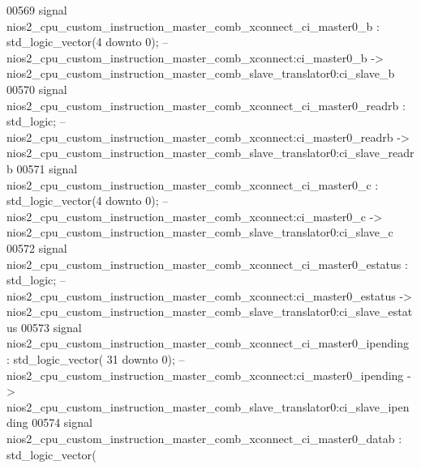 \begin{DoxyCode}
00569     \textcolor{keywordflow}{signal} \textcolor{vhdlchar}{nios2_cpu_custom_instruction_master_comb_xconnect_ci_master0_b}              \textcolor{vhdlchar}{:} \textcolor{comment}{std\_logic\_vector}\textcolor{vhdlchar}{(}\textcolor{vhdllogic}{}\textcolor{vhdllogic}{4}
       \textcolor{keywordflow}{downto} \textcolor{vhdllogic}{}\textcolor{vhdllogic}{0}\textcolor{vhdlchar}{)};\textcolor{keyword}{  -- nios2\_cpu\_custom\_instruction\_master\_comb\_xconnect:ci\_master0\_b ->
       nios2\_cpu\_custom\_instruction\_master\_comb\_slave\_translator0:ci\_slave\_b}
00570     \textcolor{keywordflow}{signal} \textcolor{vhdlchar}{nios2_cpu_custom_instruction_master_comb_xconnect_ci_master0_readrb}         \textcolor{vhdlchar}{:} \textcolor{comment}{std\_logic};\textcolor{keyword}{        
                   -- nios2\_cpu\_custom\_instruction\_master\_comb\_xconnect:ci\_master0\_readrb ->
       nios2\_cpu\_custom\_instruction\_master\_comb\_slave\_translator0:ci\_slave\_readrb}
00571     \textcolor{keywordflow}{signal} \textcolor{vhdlchar}{nios2_cpu_custom_instruction_master_comb_xconnect_ci_master0_c}              \textcolor{vhdlchar}{:} \textcolor{comment}{std\_logic\_vector}\textcolor{vhdlchar}{(}\textcolor{vhdllogic}{}\textcolor{vhdllogic}{4}
       \textcolor{keywordflow}{downto} \textcolor{vhdllogic}{}\textcolor{vhdllogic}{0}\textcolor{vhdlchar}{)};\textcolor{keyword}{  -- nios2\_cpu\_custom\_instruction\_master\_comb\_xconnect:ci\_master0\_c ->
       nios2\_cpu\_custom\_instruction\_master\_comb\_slave\_translator0:ci\_slave\_c}
00572     \textcolor{keywordflow}{signal} \textcolor{vhdlchar}{nios2_cpu_custom_instruction_master_comb_xconnect_ci_master0_estatus}        \textcolor{vhdlchar}{:} \textcolor{comment}{std\_logic};\textcolor{keyword}{        
                   -- nios2\_cpu\_custom\_instruction\_master\_comb\_xconnect:ci\_master0\_estatus ->
       nios2\_cpu\_custom\_instruction\_master\_comb\_slave\_translator0:ci\_slave\_estatus}
00573     \textcolor{keywordflow}{signal} \textcolor{vhdlchar}{nios2_cpu_custom_instruction_master_comb_xconnect_ci_master0_ipending}       \textcolor{vhdlchar}{:} \textcolor{comment}{std\_logic\_vector}\textcolor{vhdlchar}{(}\textcolor{vhdllogic}{}\textcolor{vhdllogic}{
      31} \textcolor{keywordflow}{downto} \textcolor{vhdllogic}{}\textcolor{vhdllogic}{0}\textcolor{vhdlchar}{)};\textcolor{keyword}{ -- nios2\_cpu\_custom\_instruction\_master\_comb\_xconnect:ci\_master0\_ipending ->
       nios2\_cpu\_custom\_instruction\_master\_comb\_slave\_translator0:ci\_slave\_ipending}
00574     \textcolor{keywordflow}{signal} \textcolor{vhdlchar}{nios2_cpu_custom_instruction_master_comb_xconnect_ci_master0_datab}          \textcolor{vhdlchar}{:} \textcolor{comment}{std\_logic\_vector}\textcolor{vhdlchar}{(}\textcolor{vhdllogic}{}\textcolor{vhdllogic}{
}
\end{DoxyCode}
